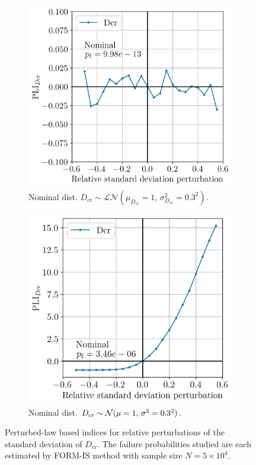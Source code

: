 \begin{figure}
    \centering
    \begin{subfigure}[t]{0.48\linewidth}
        \includegraphics[width=\linewidth]{./part3/figures/OWT/PLI_Dcr_Hyp_LogNormal.png}
        \caption{Nominal dist. $D_{\mathrm{cr}} \sim \mathcal{LN}(\mu_{D_{\mathrm{cr}}}=1, \, \sigma^2_{D_{\mathrm{cr}}}=0.3^2)$.}
    \end{subfigure}
    \begin{subfigure}[t]{0.45\linewidth}
        \includegraphics[width=\linewidth]{./part3/figures/OWT/PLI_Dcr_Hyp_Normal.png}
        \caption{Nominal dist. $D_{\mathrm{cr}} \sim \mathcal{N}(\mu=1, \, \sigma^2=0.3^2)$.}
    \end{subfigure}
    \caption{Perturbed-law based indices for relative perturbations of the standard deviation of $D_{\mathrm{cr}}$. 
    The failure probabilities studied are each estimated by FORM-IS method with sample size $N=5 \times 10^4$.}
    \label{fig:pli_resistance}
\end{figure}

